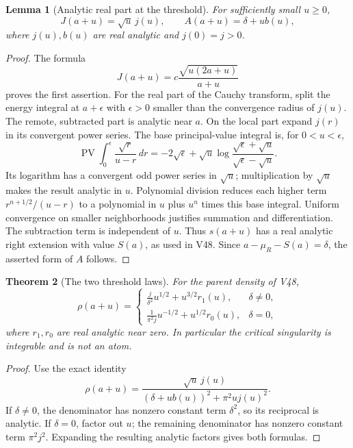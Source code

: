 \documentclass[11pt]{article}
\newtheorem{theorem}{Theorem}[section]
\newtheorem{lemma}[theorem]{Lemma}
\theoremstyle{remark}
\begin{document}
\begin{lemma}[Analytic real part at the threshold]
\label{lem:v20v49-analytic}
For sufficiently small \(u\geq0\),
\[
 J(a+u)=\sqrt u\,j(u),\qquad
 A(a+u)=\delta+u b(u),
\]
where \(j(u),b(u)\) are real analytic and \(j(0)=j>0\).
\end{lemma}
\begin{proof}
The formula
\[
 J(a+u)=c\frac{\sqrt{u(2a+u)}}{a+u}
\]
proves the first assertion.  For the real part of the Cauchy
transform, split the energy integral at \(a+\epsilon\) with
\(\epsilon>0\) smaller than the convergence radius of \(j(u)\).
The remote, subtracted part is analytic near \(a\).
On the local part expand \(j(r)\) in its convergent power series.
The base principal-value integral is, for \(0<u<\epsilon\),
\[
 \operatorname{PV}\int_0^\epsilon
 \frac{\sqrt r}{u-r}\,dr
 =-2\sqrt\epsilon+
 \sqrt u\log\frac{\sqrt\epsilon+\sqrt u}{\sqrt\epsilon-\sqrt u}.
\]
Its logarithm has a convergent odd power series in \(\sqrt u\);
multiplication by \(\sqrt u\) makes the result analytic in \(u\).
Polynomial division reduces each higher term
\(r^{n+1/2}/(u-r)\) to a polynomial in \(u\) plus \(u^n\)
times this base integral.  Uniform convergence on smaller
neighborhoods justifies summation and differentiation.
The subtraction term is independent of \(u\).
Thus \(s(a+u)\) has a real analytic right extension with value
\(S(a)\), as used in V48.  Since
\(a-\mu_R-S(a)=\delta\), the asserted form of \(A\) follows.
\end{proof}

\begin{theorem}[The two threshold laws]
\label{thm:v20v49-density}
For the parent density of V48,
\[
 \rho(a+u)=
 \begin{cases}
 \displaystyle \frac{j}{\delta^2}u^{1/2}
                   +u^{3/2}r_1(u),&\delta\neq0,\\
 \displaystyle \frac1{\pi^2j}u^{-1/2}
                   +u^{1/2}r_0(u),&\delta=0,
 \end{cases}
\]
where \(r_1,r_0\) are real analytic near zero.  In particular
the critical singularity is integrable and is not an atom.
\end{theorem}
\begin{proof}
Use the exact identity
\[
 \rho(a+u)=\frac{\sqrt u\,j(u)}
 {(\delta+u b(u))^2+\pi^2u j(u)^2}.
\]
If \(\delta\neq0\), the denominator has nonzero constant
term \(\delta^2\), so its reciprocal is analytic.
If \(\delta=0\), factor out \(u\); the remaining denominator
has nonzero constant term \(\pi^2j^2\).
Expanding the resulting analytic factors gives both formulas.
\end{proof}
\end{document}

